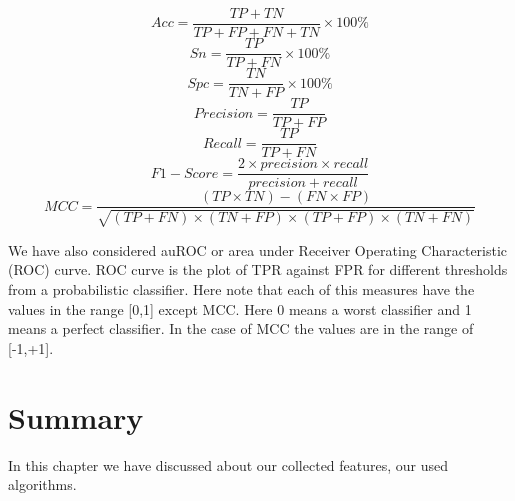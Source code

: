 \small{
\[ Acc = \frac{TP + TN}{TP + FP + FN + TN} \times 100\% \]
\[ Sn = \frac{TP}{TP + FN} \times 100\% \]
\[ Spc = \frac{TN}{TN + FP} \times 100\% \]
\[ Precision = \frac{TP}{TP + FP} \]
\[ Recall = \frac{TP}{TP + FN}\]
\[ F1-Score = \frac{2 \times precision \times recall}{precision + recall}\]
\scriptsize{
\[ MCC = \frac{(TP \times TN) - (FN \times FP)}{\sqrt{(TP+FN) \times (TN+FP) \times (TP+FP) \times (TN+FN)}} \]
}}

We have also considered auROC or area under Receiver Operating Characteristic (ROC) curve. ROC curve is the plot of TPR against FPR for different thresholds from a probabilistic classifier. Here note that each of this measures have the values in the range [0,1] except MCC. Here 0 means a worst classifier and 1 means a perfect classifier. In the case of MCC the values are in the range of [-1,+1]. 

\section{Summary}

In this chapter we have discussed about our collected features, our used algorithms.


